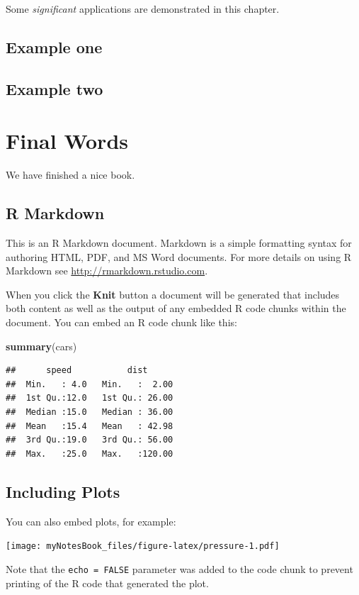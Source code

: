 \documentclass[]{book}
\newenvironment{Shaded}{\begin{snugshade}}{\end{snugshade}}
\newcommand{\KeywordTok}[1]{\textcolor[rgb]{0.13,0.29,0.53}{\textbf{#1}}}
\newcommand{\NormalTok}[1]{#1}
\theoremstyle{definition}
\theoremstyle{definition}
\theoremstyle{definition}
\theoremstyle{remark}
\begin{document}
Some \emph{significant} applications are demonstrated in this chapter.

\section{Example one}\label{example-one}

\section{Example two}\label{example-two}

\chapter{Final Words}\label{final-words}

We have finished a nice book.

\section{R Markdown}\label{r-markdown}

This is an R Markdown document. Markdown is a simple formatting syntax
for authoring HTML, PDF, and MS Word documents. For more details on
using R Markdown see \url{http://rmarkdown.rstudio.com}.

When you click the \textbf{Knit} button a document will be generated
that includes both content as well as the output of any embedded R code
chunks within the document. You can embed an R code chunk like this:

\begin{Shaded}
\begin{Highlighting}[]
\KeywordTok{summary}\NormalTok{(cars)}
\end{Highlighting}
\end{Shaded}

\begin{verbatim}
##      speed           dist       
##  Min.   : 4.0   Min.   :  2.00  
##  1st Qu.:12.0   1st Qu.: 26.00  
##  Median :15.0   Median : 36.00  
##  Mean   :15.4   Mean   : 42.98  
##  3rd Qu.:19.0   3rd Qu.: 56.00  
##  Max.   :25.0   Max.   :120.00
\end{verbatim}

\section{Including Plots}\label{including-plots}

You can also embed plots, for example:

\texttt{[image: myNotesBook\_files/figure-latex/pressure-1.pdf]}

Note that the \texttt{echo\ =\ FALSE} parameter was added to the code
chunk to prevent printing of the R code that generated the plot.


\end{document}
